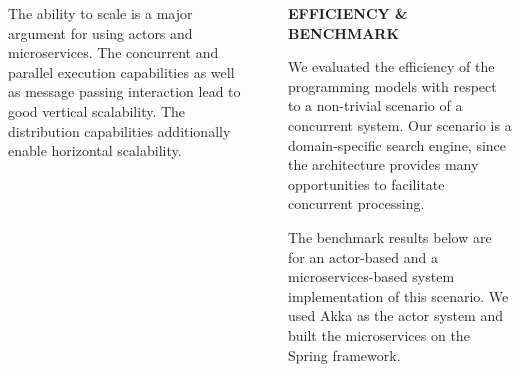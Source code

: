\documentclass[final,hyperref={pdfpagelabels=true}]{beamer}
\begin{document}
\begin{frame}
\begin{columns}[t]
\begin{column}{.43\textwidth}
{\begin{description}
          \vspace*{\baselineskip}

          \item[\textbf{\textsf{Scalability}}] 
          \begin{justify}
          The ability to scale is a major argument for using actors and microservices. The concurrent and parallel execution capabilities as well as message passing interaction lead to good vertical scalability. The distribution capabilities additionally enable horizontal scalability.
          \end{justify}
        \end{description}
        
      }
    \end{column}
    \begin{column}{.06\textwidth}
      \end{column}
    \begin{column}{.43\textwidth}
      \textsf{\textbf{EFFICIENCY \& BENCHMARK}} \\
      \vspace*{.5\baselineskip}
      {\lmodern
        \begin{justify}
        We evaluated the efficiency of the programming models with respect to a non-trivial scenario of a concurrent system. Our scenario is a domain-specific search engine, since the architecture provides many opportunities to facilitate concurrent processing. 
        
        \vspace*{\baselineskip}
        
        The benchmark results below are for an actor-based and a microservices-based system implementation of this scenario. We used Akka as the actor system and built the microservices on the Spring framework.
        \end{justify}
      }

      \vspace*{\baselineskip}
      

\end{column}
\end{columns}
\end{frame}
\end{document}
